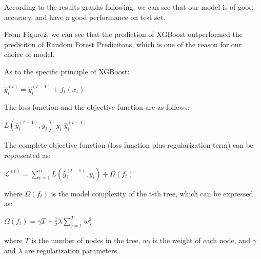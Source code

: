 According to the results graphs following, we can see that our model is of good accuracy, and have a good performance on test set.


From Figure2, we can see that the prediction of XGBoost outperformed the prediciton of Random Forest Predicitons, which is one of the reason for our choice of model.

As to the specific principle of XGBoost:

\begin{center}
    $\hat{y}_i^{(t)} = \hat{y}_i^{(t-1)} + f_t(x_i)$
\end{center}

The loss function and the objective function are as follows:

$L(\hat{y}_i^{(t-1)}, y_i)$ \quad {} $y_i$  $\hat{y}_i^{(t-1)}$

The complete objective function (loss function plus regularization term) can be represented as:
\begin{center}
    $\mathcal{L}^{(t)} = \sum_{i=1}^n L(\hat{y}_i^{(t-1)}, y_i) + \Omega(f_t)$
\end{center}

where $\Omega(f_t)$ is the model complexity of the t-th tree, which can be expressed as:

\begin{center}
    $\Omega(f_t) = \gamma T + \frac{1}{2} \lambda \sum_{j=1}^T w_j^2$
\end{center}

where $T$ is the number of nodes in the tree, $w_j$ is the weight of each node, and $\gamma$ and $\lambda$ are regularization parameters.

